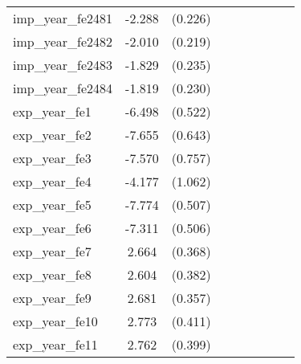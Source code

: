 {\begin{tabular}{l*{4}{cc}}
imp\_year\_fe2481&   -2.288\sym{***}&  (0.226)&                  &         &                  &         &                  &         \\
imp\_year\_fe2482&   -2.010\sym{***}&  (0.219)&                  &         &                  &         &                  &         \\
imp\_year\_fe2483&   -1.829\sym{***}&  (0.235)&                  &         &                  &         &                  &         \\
imp\_year\_fe2484&   -1.819\sym{***}&  (0.230)&                  &         &                  &         &                  &         \\
exp\_year\_fe1&   -6.498\sym{***}&  (0.522)&                  &         &                  &         &                  &         \\
exp\_year\_fe2&   -7.655\sym{***}&  (0.643)&                  &         &                  &         &                  &         \\
exp\_year\_fe3&   -7.570\sym{***}&  (0.757)&                  &         &                  &         &                  &         \\
exp\_year\_fe4&   -4.177\sym{***}&  (1.062)&                  &         &                  &         &                  &         \\
exp\_year\_fe5&   -7.774\sym{***}&  (0.507)&                  &         &                  &         &                  &         \\
exp\_year\_fe6&   -7.311\sym{***}&  (0.506)&                  &         &                  &         &                  &         \\
exp\_year\_fe7&    2.664\sym{***}&  (0.368)&                  &         &                  &         &                  &         \\
exp\_year\_fe8&    2.604\sym{***}&  (0.382)&                  &         &                  &         &                  &         \\
exp\_year\_fe9&    2.681\sym{***}&  (0.357)&                  &         &                  &         &                  &         \\
exp\_year\_fe10&    2.773\sym{***}&  (0.411)&                  &         &                  &         &                  &         \\
exp\_year\_fe11&    2.762\sym{***}&  (0.399)&                  &         &                  &         &                  &         \\

\end{tabular}}
